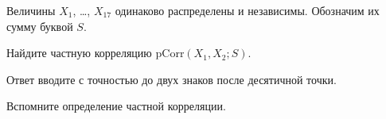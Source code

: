 
\begin{question}
Величины \(X_1\), \ldots, \(X_{17}\) одинаково распределены и независимы.
Обозначим их сумму буквой \(S\).

Найдите частную корреляцию \(\mathrm{pCorr}(X_1, X_2; S)\).

Ответ вводите с точностью до двух знаков после десятичной точки.
\end{question}

\begin{solution}
Вспомните определение частной корреляции.
\end{solution}

